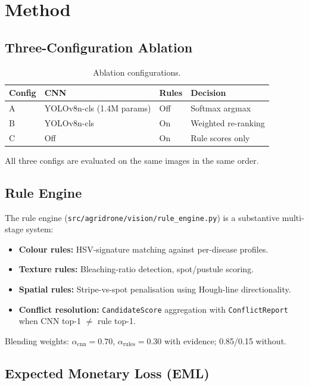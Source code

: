 \documentclass[runningheads]{llncs}
\begin{document}
\section{Method}

\subsection{Three-Configuration Ablation}

\begin{table}[h]
\centering
\caption{Ablation configurations.}
\label{tab:configs}
\begin{tabular}{@{}llll@{}}
\toprule
Config & CNN & Rules & Decision \\
\midrule
A & YOLOv8n-cls (1.4M params) & Off  & Softmax argmax \\
B & YOLOv8n-cls               & On   & Weighted re-ranking \\
C & Off                        & On   & Rule scores only \\
\bottomrule
\end{tabular}
\end{table}

\noindent All three configs are evaluated on the same images in the same order.

\subsection{Rule Engine}

The rule engine (\texttt{src/agridrone/vision/rule\_engine.py}) is a
substantive multi-stage system:
\begin{itemize}
  \item \textbf{Colour rules:} HSV-signature matching against per-disease profiles.
  \item \textbf{Texture rules:} Bleaching-ratio detection, spot/pustule scoring.
  \item \textbf{Spatial rules:} Stripe-vs-spot penalisation using Hough-line directionality.
  \item \textbf{Conflict resolution:} \texttt{CandidateScore} aggregation with
        \texttt{ConflictReport} when CNN top-1 $\neq$ rule top-1.
\end{itemize}

Blending weights: $\alpha_{\text{cnn}}=0.70$, $\alpha_{\text{rules}}=0.30$
with evidence; 0.85/0.15 without.

\subsection{Expected Monetary Loss (EML)}
\end{document}
